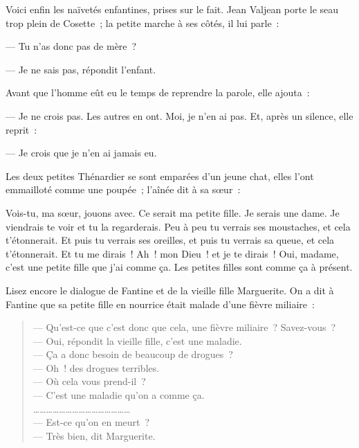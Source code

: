 \documentclass[french,twoside]{book} %
\newenvironment{quoteblock}%
  {\begin{quoting}}
  {\end{quoting}}
\newenvironment{quotebar}{%
    \def\FrameCommand{{\color{rubric!10!}\vrule width 0.5em} \hspace{0.9em}}%
    \def\OuterFrameSep{\itemsep} %
    \MakeFramed {\advance\hsize-\width \FrameRestore}
  }%
  {%
    \endMakeFramed
  }
\renewenvironment{quoteblock}%
  {%
    \savenotes
    \setstretch{0.9}
    \normalfont
    \begin{quotebar}
  }
  {%
    \end{quotebar}
    \spewnotes
  }
\begin{document}
\noindent Voici enfin les naïvetés enfantines, prises sur le fait. Jean Valjean porte le seau trop plein de Cosette ; la petite marche à ses côtés, il lui parle :\par

\begin{quoteblock}
 \noindent — Tu n’as donc pas de mère ?\par
 — Je ne sais pas, répondit l’enfant.\par
 Avant que l’homme eût eu le temps de reprendre la parole, elle ajouta :\par
 — Je ne crois pas. Les autres en ont. Moi, je n’en ai pas. Et, après un silence, elle reprit :\par
 — Je crois que je n’en ai jamais eu.
 \end{quoteblock}

\noindent Les deux petites Thénardier se sont emparées d’un jeune chat, elles l’ont emmailloté comme une poupée ; l’aînée dit à sa sœur :\par

\begin{quoteblock}
 \noindent Vois-tu, ma sœur, jouons avec. Ce serait ma petite fille. Je serais une dame. Je viendrais te voir et tu la regarderais. Peu à peu tu verrais ses moustaches, et cela t’étonnerait. Et puis tu verrais ses oreilles, et puis tu verrais sa queue, et cela t’étonnerait. Et tu me dirais ! Ah ! mon Dieu ! et je te dirais ! Oui, madame, c’est une petite fille que j’ai comme ça. Les petites filles sont comme ça à présent.
 \end{quoteblock}

\noindent Lisez encore le dialogue de Fantine et de la vieille fille Marguerite. On a dit à Fantine que sa petite fille en nourrice était malade d’une fièvre miliaire :\par


\begin{verse}
— Qu’est-ce que c’est donc que cela, une fièvre miliaire ? Savez-vous ?\\
— Oui, répondit la vieille fille, c’est une maladie.\\
— Ça a donc besoin de beaucoup de drogues ?\\
— Oh ! des drogues terribles.\\
— Où cela vous prend-il ?\\
— C’est une maladie qu’on a comme ça.\\
………………………………………\\
— Est-ce qu’on en meurt ?\\
— Très bien, dit Marguerite.\\
\end{verse}
\end{document}
